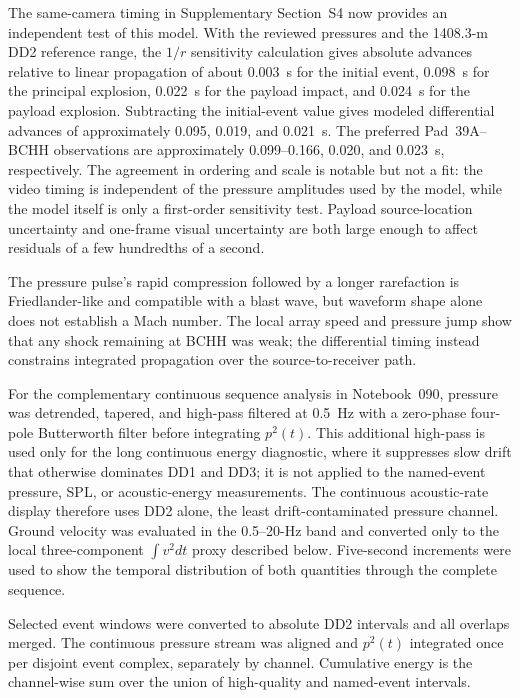 \documentclass[]{seismica}
\begin{document}
The same-camera timing in Supplementary Section~S4 now provides an independent
test of this model. With the reviewed pressures and the 1408.3-m DD2 reference
range, the $1/r$ sensitivity calculation gives absolute advances relative to
linear propagation of about 0.003~s for the initial event, 0.098~s for the
principal explosion, 0.022~s for the payload impact, and 0.024~s for the
payload explosion. Subtracting the initial-event value gives modeled
differential advances of approximately 0.095, 0.019, and 0.021~s. The
preferred Pad~39A--BCHH observations are approximately 0.099--0.166, 0.020,
and 0.023~s, respectively. The agreement in ordering and scale is notable but
not a fit: the video timing is independent of the pressure amplitudes used by
the model, while the model itself is only a first-order sensitivity test.
Payload source-location uncertainty and one-frame visual uncertainty are both
large enough to affect residuals of a few hundredths of a second.

The pressure pulse's rapid compression followed by a longer rarefaction is
Friedlander-like and compatible with a blast wave, but waveform shape alone
does not establish a Mach number. The local array speed and pressure jump show
that any shock remaining at BCHH was weak; the differential timing instead
constrains integrated propagation over the source-to-receiver path.

For the complementary continuous sequence analysis in Notebook~090,
pressure was detrended, tapered, and high-pass filtered at 0.5~Hz with a
zero-phase four-pole Butterworth filter before integrating $p^2(t)$. This
additional high-pass is used only for the long continuous energy diagnostic,
where it suppresses slow drift that otherwise dominates DD1 and DD3; it is not
applied to the named-event pressure, SPL, or acoustic-energy measurements.
The continuous acoustic-rate display therefore uses DD2 alone, the least
drift-contaminated pressure channel. Ground velocity was evaluated in the
0.5--20-Hz band and converted only to the local three-component
$\int v^2dt$ proxy described below. Five-second increments were used to show
the temporal distribution of both quantities through the complete sequence.

Selected event windows were converted to absolute DD2 intervals and all
overlaps merged. The continuous pressure stream was aligned and $p^2(t)$
integrated once per disjoint event complex, separately by channel. Cumulative
energy is the channel-wise sum over the union of high-quality and named-event
intervals.
\end{document}
